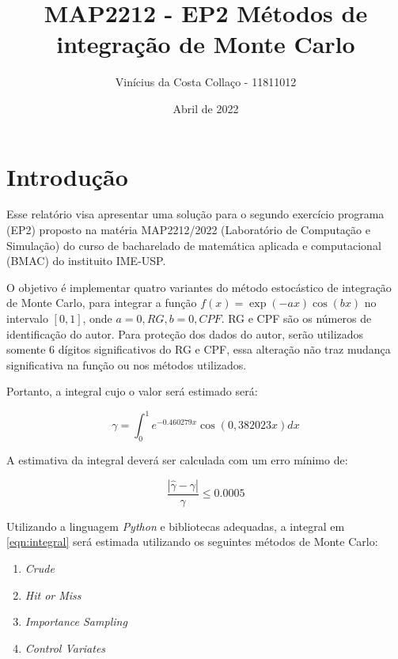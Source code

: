 \documentclass{article}
\title{MAP2212 - EP2 Métodos de integração de Monte Carlo}
\author{Vinícius da Costa Collaço - 11811012}
\date{Abril de 2022}
\begin{document}
\maketitle

\section{Introdução}


Esse relatório visa apresentar uma solução para o segundo exercício programa (EP2) proposto na matéria MAP2212/2022 (Laboratório de Computação e Simulação) do curso de bacharelado de matemática aplicada e computacional (BMAC) do instituito IME-USP.

O objetivo é implementar quatro variantes do método estocástico de integração de Monte Carlo, para integrar a função $f(x) = \exp{(-ax)}\cos{(bx)}$ no intervalo $[0,1]$, onde $a = 0,RG, b = 0,CPF$. RG e CPF são os números de identificação do autor. Para proteção dos dados do autor, serão utilizados somente 6 dígitos significativos do RG e CPF, essa alteração não traz mudança significativa na função ou nos métodos utilizados.

Portanto, a integral cujo o valor será estimado será:

\begin{equation}
    \gamma = \int_0^1 e^{-0.460279x}\cos{(0,382023x)} dx
    \label{eqn:integral}
\end{equation}

A estimativa da integral deverá ser calculada com um erro mínimo de:

\begin{equation}
    \frac{|{\hat{\gamma}-\gamma}|}{\gamma} \leq 0.0005
    \label{eqn:erro}
\end{equation}

Utilizando a linguagem \textit{Python} e bibliotecas adequadas\cite{harris2020array, Waskom2021, Hunter:2007, 2020SciPy-NMeth}, a integral em \ref{eqn:integral} será estimada utilizando os seguintes métodos de Monte Carlo:


\begin{enumerate}
    \item \textit{Crude}
    \item \textit{Hit or Miss}
    \item \textit{Importance Sampling}
    \item \textit{Control Variates}
\end{enumerate}
\end{document}
